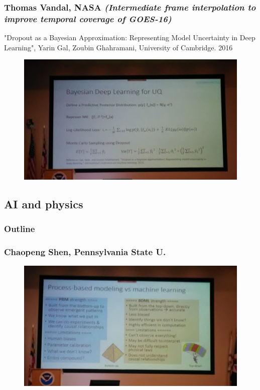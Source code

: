 \documentclass{beamer}
\begin{document}
\begin{frame}
\frametitle{Thomas Vandal, NASA \textit{(Intermediate frame interpolation to improve temporal coverage of GOES-16)}}
"Dropout as a Bayesian Approximation:
Representing Model Uncertainty in Deep Learning", Yarin Gal, Zoubin Ghahramani, University of Cambridge. 2016

\begin{figure}
	\includegraphics[width=.9\linewidth]{figs/P_20190424_112041.jpg}
\end{figure}
\end{frame}


\subsection{AI and physics}

\begin{frame}
\frametitle{Outline} %
\tableofcontents[currentsection] %
\end{frame}

\begin{frame}
\frametitle{Chaopeng Shen, Pennsylvania State U.}
\begin{figure}
	\includegraphics[width=.9\linewidth]{figs/P_20190424_114648.jpg}
\end{figure}
\end{frame}
\end{document}
